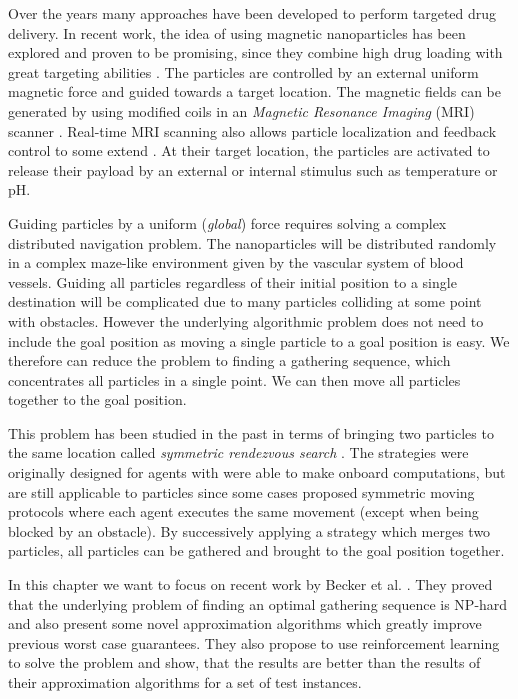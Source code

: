 Over the years many approaches have been developed to perform targeted drug delivery. In recent work, the idea of using magnetic nanoparticles has been explored and proven to be promising, since they combine high drug loading with great targeting abilities \cite{vangijzegem2019magnetic, albinali2019perspective}. The particles are controlled by an external uniform magnetic force and guided towards a target location. The magnetic fields can be generated by using modified coils in an \textit{Magnetic Resonance Imaging} (MRI) scanner \cite{mathieu2007magnetic, mellal2015magnetic}. Real-time MRI scanning also allows particle localization and feedback control to some extend \cite{pouponneau2009magnetic}. At their target location, the particles are activated to release their payload by an external or internal stimulus such as temperature or pH.

Guiding particles by a uniform (\textit{global}) force requires solving a complex distributed navigation problem. The nanoparticles will be distributed randomly in a complex maze-like environment given by the vascular system of blood vessels. Guiding all particles regardless of their initial position to a single destination will be complicated due to many particles colliding at some point with obstacles. However the underlying algorithmic problem does not need to include the goal position as moving a single particle to a goal position is easy. We therefore can reduce the problem to finding a gathering sequence, which concentrates all particles in a single point. We can then move all particles together to the goal position. 

This problem has been studied in the past in terms of bringing two particles to the same location called \textit{symmetric rendezvous search} \cite{anderson2001two,alpern2006theory}. The strategies were originally designed for agents with were able to make onboard computations, but are still applicable to particles since some cases proposed symmetric moving protocols where each agent executes the same movement (except when being blocked by an obstacle). By successively applying a strategy which merges two particles, all particles can be gathered and brought to the goal position together. 

In this chapter we want to focus on recent work by Becker et al. \cite{becker2020}. They proved that the underlying problem of finding an optimal gathering sequence is NP-hard and also present some novel approximation algorithms which greatly improve previous worst case guarantees. They also propose to use reinforcement learning to solve the problem and show, that the results are better than the results of their approximation algorithms for a set of test instances.

